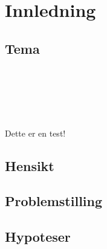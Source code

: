 \section{Innledning}

\subsection{Tema}

\parencite{datatilsynet_personvern}\\
\parencite{regjeringen_personvern}\\
\parencite{regjeringen_gdpr}\\
\parencite{regjeringen_nylov}\\
\parencite{test}\\

Dette er en test!

\subsection{Hensikt}

\subsection{Problemstilling}

\subsection{Hypoteser}

\newpage